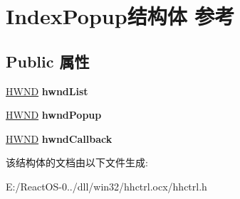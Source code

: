 \hypertarget{struct_index_popup}{}\section{Index\+Popup结构体 参考}
\label{struct_index_popup}
\subsection*{Public 属性}
\begin{DoxyCompactItemize}
\item 
\mbox{\label{struct_index_popup_af4112f3f263c299f7ab66bcdb9a60eb9}} 
\hyperlink{interfacevoid}{H\+W\+ND} {\bfseries hwnd\+List}
\item 
\mbox{\label{struct_index_popup_a96f8a9cdf827f0e81b7ff475847c6630}} 
\hyperlink{interfacevoid}{H\+W\+ND} {\bfseries hwnd\+Popup}
\item 
\mbox{\label{struct_index_popup_a8c562796bc1d7aaf36f3cdf4b5ee0951}} 
\hyperlink{interfacevoid}{H\+W\+ND} {\bfseries hwnd\+Callback}
\end{DoxyCompactItemize}


该结构体的文档由以下文件生成\+:\begin{DoxyCompactItemize}
\item 
E\+:/\+React\+O\+S-\/0../dll/win32/hhctrl.\+ocx/hhctrl.\+h\end{DoxyCompactItemize}
